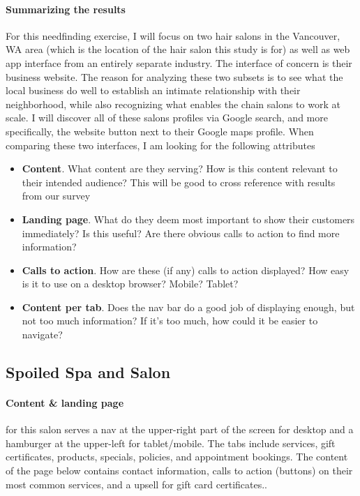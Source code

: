 \paragraph{Summarizing the results}
For this needfinding exercise, I will focus on two hair salons in the Vancouver, WA area (which is the location of the hair salon this study is for) as well as web app interface from an entirely separate industry. The interface of concern is their business website. The reason for analyzing these two subsets is to see what the local business do well to establish an intimate relationship with their neighborhood, while also recognizing what enables the chain salons to work at scale. I will discover all of these salons profiles via Google search, and more specifically, the website button next to their Google maps profile. When comparing these two interfaces, I am looking for the following attributes
\begin{itemize}
\item
  \textbf{Content}. What content are they serving? How is this content relevant to their intended audience? This will be good to cross reference with results from our survey
\item
  \textbf{Landing page}. What do they deem most important to show their customers immediately? Is this useful? Are there obvious calls to action to find more information?
\item
  \textbf{Calls to action}. How are these (if any) calls to action displayed? How easy is it to use on a desktop browser? Mobile? Tablet?
\item
  \textbf{Content per tab}. Does the nav bar do a good job of displaying enough, but not too much information? If it's too much, how could it be easier to navigate?
\end{itemize}

\subsection{Spoiled Spa and Salon}

\paragraph{Content & landing page}
for this salon serves a nav at the upper-right part of the screen for desktop and a hamburger at the upper-left for tablet/mobile. The tabs include services, gift certificates, products, specials, policies, and appointment bookings. The content of the page below contains contact information, calls to action (buttons) on their most common services, and a upsell for gift card certificates..

